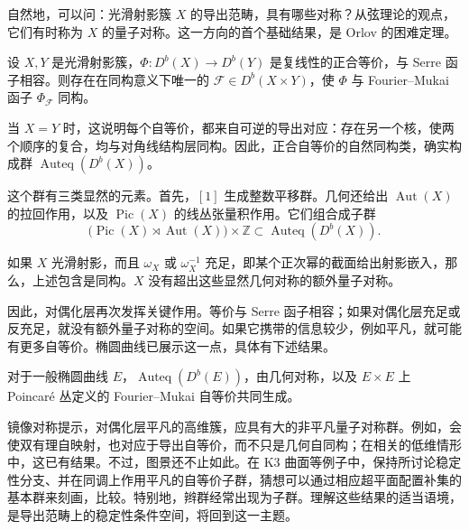 自然地，可以问：光滑射影簇 $X$ 的导出范畴，具有哪些对称？从弦理论的观点，它们有时称为 $X$ 的量子对称。这一方向的首个基础结果，是 Orlov 的困难定理。
\begin{theorem}\label{thm:4.82}
设 $X,Y$ 是光滑射影簇，$\Phi\colon D^b(X)\to D^b(Y)$ 是复线性的正合等价，与 Serre 函子相容。则存在在同构意义下唯一的 $\mathcal{F}\in D^b(X\times Y)$，使 $\Phi$ 与 Fourier--Mukai 函子 $\Phi_{\mathcal{F}}$ 同构。
\end{theorem}

当 $X=Y$ 时，这说明每个自等价，都来自可逆的导出对应：存在另一个核，使两个顺序的复合，均与对角线结构层同构。因此，正合自等价的自然同构类，确实构成群 $\operatorname{Auteq}(D^b(X))$。

这个群有三类显然的元素。首先，$[1]$ 生成整数平移群。几何还给出 $\operatorname{Aut}(X)$ 的拉回作用，以及 $\operatorname{Pic}(X)$ 的线丛张量积作用。它们组合成子群
\[
\bigl(\operatorname{Pic}(X)\rtimes\operatorname{Aut}(X)\bigr)
\times\mathbb{Z}\subset\operatorname{Auteq}(D^b(X)).
\]

\begin{theorem}\label{thm:4.83}
如果 $X$ 光滑射影，而且 $\omega_X$ 或 $\omega_X^{-1}$ 充足，即某个正次幂的截面给出射影嵌入，那么，上述包含是同构。$X$ 没有超出这些显然几何对称的额外量子对称。
\end{theorem}

因此，对偶化层再次发挥关键作用。等价与 Serre 函子相容；如果对偶化层充足或反充足，就没有额外量子对称的空间。如果它携带的信息较少，例如平凡，就可能有更多自等价。椭圆曲线已展示这一点，具体有下述结果。
\begin{theorem}\label{thm:4.84}
对于一般椭圆曲线 $E$，$\operatorname{Auteq}(D^b(E))$，由几何对称，以及 $E\times E$ 上 Poincar\'e 丛定义的 Fourier--Mukai 自等价共同生成。
\end{theorem}

镜像对称提示，对偶化层平凡的高维簇，应具有大的非平凡量子对称群。例如，会使双有理自映射，也对应于导出自等价，而不只是几何自同构；在相关的低维情形中，这已有结果。不过，图景还不止如此。在 K3 曲面等例子中，保持所讨论稳定性分支、并在同调上作用平凡的自等价子群，猜想可以通过相应超平面配置补集的基本群来刻画，比较。特别地，辫群经常出现为子群。理解这些结果的适当语境，是导出范畴上的稳定性条件空间，将回到这一主题。

